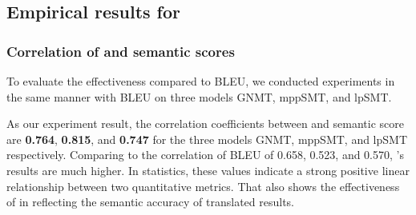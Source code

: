 \subsection{Empirical results for {\model}}
\subsubsection{Correlation of {\model} and semantic scores}
To evaluate the effectiveness {\model} compared to BLEU, we conducted experiments 
in the same manner with BLEU on three models GNMT, mppSMT, and lpSMT. 

%

As our experiment result, the correlation coefficients between {\model} and
semantic score are \textbf{0.764}, \textbf{0.815}, and \textbf{0.747} for the 
three models GNMT, mppSMT, and lpSMT  respectively. Comparing to the correlation 
of BLEU of 0.658, 0.523, and 0.570, {\model}'s results are much higher. 
In statistics, these values indicate a strong positive linear relationship between two 
quantitative metrics. That also shows the effectiveness of {\model} in reflecting the 
semantic accuracy of translated results.



